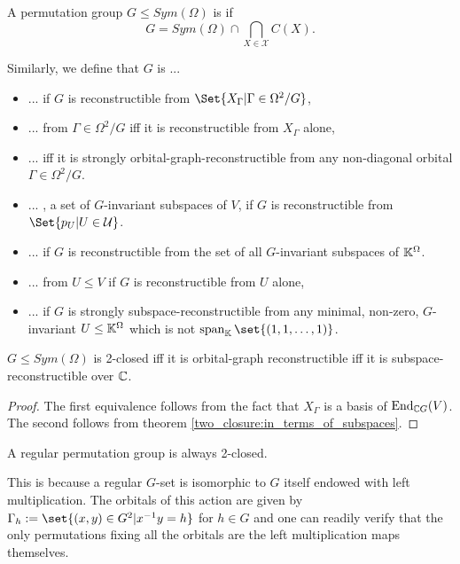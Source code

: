 \documentclass[fontsize=11pt,fleqn,a4paper]{scrartcl}
\begin{document}
\begin{definition}
A permutation group $G\leq Sym(\Omega)$ is  if
\[G = Sym(\Omega) \cap \bigcap_{X\in\mathcal{X}} C(X).\]

Similarly, we define that $G$ is ...
\begin{itemize}
\item ...  if $G$ is reconstructible from $\Set{X_\Gamma | \Gamma\in\Omega^2/G}$,
\item ...  from  $\Gamma\in\Omega^2/G$ iff it is reconstructible from $X_\Gamma$ alone,
\item ...  iff it is strongly orbital-graph-reconstructible from any non-diagonal orbital $\Gamma\in\Omega^2/G$.
\item ... , a set of $G$-invariant subspaces of $V$, if $G$ is reconstructible from $\Set{p_U | U\in\mathcal{U}}$.
\item ...  if $G$ is reconstructible from the set of all $G$-invariant subspaces of $\mathbb{K}^\Omega$.
\item ...  from $U\leq V$ if $G$ is reconstructible from $U$ alone,
\item ...  if $G$ is strongly subspace-reconstructible from any minimal, non-zero, $G$-invariant $U\leq\mathbb{K}^\Omega$ which is not $\LinHull_\IK\set{(1,1,\ldots,1)}$.
\end{itemize}
\end{definition}

\begin{corollary}
$G\leq Sym(\Omega)$ is 2-closed iff it is orbital-graph reconstructible iff it is subspace-reconstructible over $\mathbb{C}$.
\end{corollary}
\begin{proof}
The first equivalence follows from the fact that $X_\Gamma$ is a basis of $\operatorname{End}_{\mathbb{C} G}(V)$. The second follows from theorem \ref{two_closure:in_terms_of_subspaces}.
\end{proof}

\begin{example}
A regular permutation group is always 2-closed.

This is because a regular $G$-set is isomorphic to $G$ itself endowed with left multiplication. The orbitals of this action are given by $\Gamma_h:=\set{(x,y)\in G^2 | x^{-1} y=h}$ for $h\in G$ and one can readily verify that the only permutations fixing all the orbitals are the left multiplication maps themselves.
\end{example}
\end{document}
